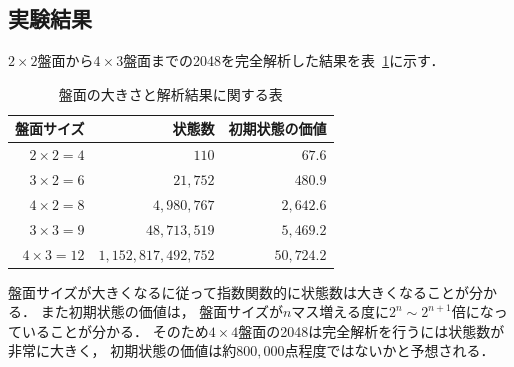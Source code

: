 \subsection{実験結果}
$2\times2$盤面から$4\times3$盤面までの2048を完全解析した結果を表~\ref{table: analysis_table}に示す．
\begin{table}[t]
    \centering
    \begin{tabular}{rrr}
        \hline \hline
        盤面サイズ & 状態数 & 初期状態の価値\\ \hline
        $2\times2=4$ & $110$ & $67.6$ \\
        $3\times2=6$ & $21,752$ & $480.9$ \\
        $4\times2=8$ & $4,980,767$ & $2,642.6$ \\
        $3\times3=9$ & $48,713,519$ & $5,469.2$ \\
        $4\times3=12$ & $1,152,817,492,752$ & $50,724.2$ \\
        \hline
    \end{tabular}
    \caption{盤面の大きさと解析結果に関する表}
    \label{table: analysis_table}
\end{table}
盤面サイズが大きくなるに従って指数関数的に状態数は大きくなることが分かる．
また初期状態の価値は， 盤面サイズが$n$マス増える度に$2^n \sim 2^{n+1}$倍になっていることが分かる．
そのため$4\times4$盤面の2048は完全解析を行うには状態数が非常に大きく， 初期状態の価値は約$800,000$点程度ではないかと予想される．

